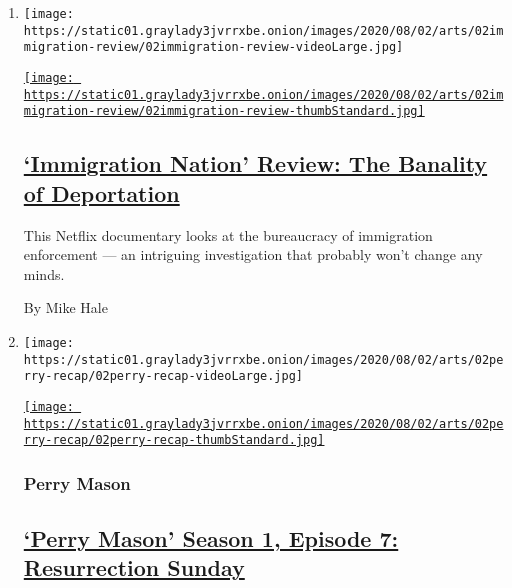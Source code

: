 \begin{enumerate}
\def\labelenumi{\arabic{enumi}.}
\item
  \texttt{[image: https://static01.graylady3jvrrxbe.onion/images/2020/08/02/arts/02immigration-review/02immigration-review-videoLarge.jpg]}

  \href{/2020/08/02/arts/television/immigration-nation-review-netflix.html}{\texttt{[image: https://static01.graylady3jvrrxbe.onion/images/2020/08/02/arts/02immigration-review/02immigration-review-thumbStandard.jpg]}}

  \hypertarget{immigration-nation-review-the-banality-of-deportation}{%
  \subsection{\texorpdfstring{\href{/2020/08/02/arts/television/immigration-nation-review-netflix.html}{`Immigration
  Nation' Review: The Banality of
  Deportation}}{`Immigration Nation' Review: The Banality of Deportation}}\label{immigration-nation-review-the-banality-of-deportation}}

  This Netflix documentary looks at the bureaucracy of immigration
  enforcement --- an intriguing investigation that probably won't change
  any minds.

  By Mike Hale
\item
  \texttt{[image: https://static01.graylady3jvrrxbe.onion/images/2020/08/02/arts/02perry-recap/02perry-recap-videoLarge.jpg]}

  \href{/2020/08/02/arts/television/perry-mason-recap-episode-7.html}{\texttt{[image: https://static01.graylady3jvrrxbe.onion/images/2020/08/02/arts/02perry-recap/02perry-recap-thumbStandard.jpg]}}

  \hypertarget{perry-mason}{%
  \subsubsection{Perry Mason}\label{perry-mason}}

  \hypertarget{perry-mason-season-1-episode-7-resurrection-sunday}{%
  \subsection{\texorpdfstring{\href{/2020/08/02/arts/television/perry-mason-recap-episode-7.html}{`Perry
  Mason' Season 1, Episode 7: Resurrection
  Sunday}}{`Perry Mason' Season 1, Episode 7: Resurrection Sunday}}\label{perry-mason-season-1-episode-7-resurrection-sunday}}


\end{enumerate}
